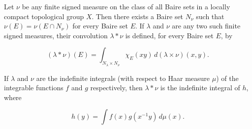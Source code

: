 Let $\nu$ be any finite signed measure on the class of all Baire sets in a locally compact topological group $X$. Then there exists a Baire set $N_\nu$ such that $\nu(E) = \nu(E \cap N_\nu)$ for every Baire set $E$. If $\lambda$ and $\nu$ are any two such finite signed measures, their convolution $\lambda * \nu$ is defined, for every Baire set $E$, by

$$(\lambda * \nu)(E) = \int_{N_\lambda \times N_\nu} \chi_E(xy) \, d(\lambda \times \nu)(x,y).$$

If $\lambda$ and $\nu$ are the indefinite integrals (with respect to Haar measure $\mu$) of the integrable functions $f$ and $g$ respectively, then $\lambda * \nu$ is the indefinite integral of $h$, where

$$h(y) = \int f(x) g(x^{-1}y) \, d\mu(x).$$
